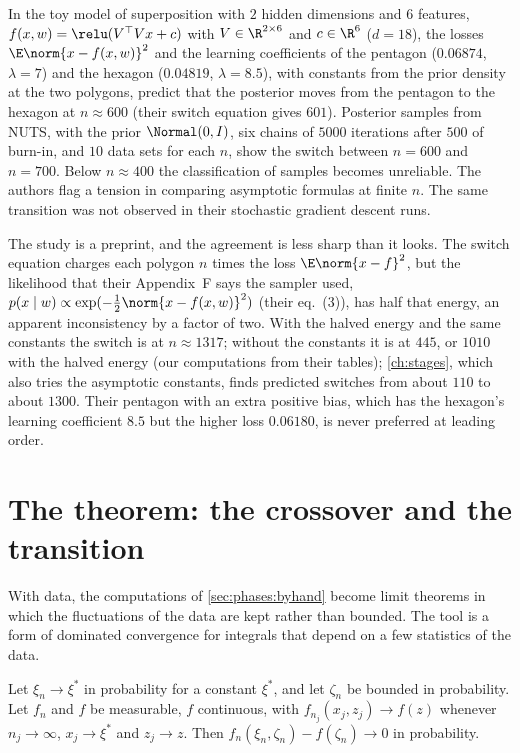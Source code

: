 \begin{refsection}
\begin{observation}
In the toy model of superposition with $2$ hidden dimensions and $6$ features, $f(x,w)=\relu(V^\top Vx+c)$ with $V\in\R^{2\times6}$ and $c\in\R^6$ ($d=18$), the losses $\E\norm{x-f(x,w)}^2$ and the learning coefficients of the pentagon ($0.06874$, $\lambda=7$) and the hexagon ($0.04819$, $\lambda=8.5$), with constants from the prior density at the two polygons, predict that the posterior moves from the pentagon to the hexagon at $n\approx600$ (their switch equation gives $601$). Posterior samples from NUTS, with the prior $\Normal(0,I)$, six chains of $5000$ iterations after $500$ of burn-in, and $10$ data sets for each $n$, show the switch between $n=600$ and $n=700$. Below $n\approx400$ the classification of samples becomes unreliable. The authors flag a tension in comparing asymptotic formulas at finite $n$. The same transition was not observed in their stochastic gradient descent runs.
\end{observation}

The study is a preprint, and the agreement is less sharp than it looks. The switch equation charges each polygon $n$ times the loss $\E\norm{x-f}^2$, but the likelihood that their Appendix~F says the sampler used, $p(x\mid w)\propto\exp(-\frac12\norm{x-f(x,w)}^2)$ (their eq.~(3)), has half that energy, an apparent inconsistency by a factor of two. With the halved energy and the same constants the switch is at $n\approx1317$; without the constants it is at $445$, or $1010$ with the halved energy (our computations from their tables); \cref{ch:stages}, which also tries the asymptotic constants, finds predicted switches from about $110$ to about $1300$. Their pentagon with an extra positive bias, which has the hexagon's learning coefficient $8.5$ but the higher loss $0.06180$, is never preferred at leading order.

\section{The theorem: the crossover and the transition}\label{sec:phases:curves}

With data, the computations of \cref{sec:phases:byhand} become limit theorems in which the fluctuations of the data are kept rather than bounded. The tool is a form of dominated convergence for integrals that depend on a few statistics of the data.

\begin{lemma}\label{lem:phases:continuous}
Let $\xi_n\to\xi^*$ in probability for a constant $\xi^*$, and let $\zeta_n$ be bounded in probability. Let $f_n$ and $f$ be measurable, $f$ continuous, with $f_{n_j}(x_j,z_j)\to f(z)$ whenever $n_j\to\infty$, $x_j\to\xi^*$ and $z_j\to z$. Then $f_n(\xi_n,\zeta_n)-f(\zeta_n)\to0$ in probability.
\end{lemma}


\end{refsection}
